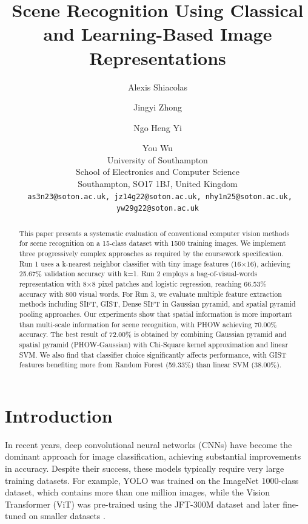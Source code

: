 \documentclass[10pt,twocolumn,letterpaper]{article}
\begin{document}
\title{Scene Recognition Using Classical and Learning-Based Image Representations}

\author{
Alexis Shiacolas \and
Jingyi Zhong \and
Ngo Heng Yi \and
You Wu \\
University of Southampton \\
School of Electronics and Computer Science \\
Southampton, SO17 1BJ, United Kingdom \\
{\tt\small
as3n23@soton.ac.uk,
jz14g22@soton.ac.uk,
nhy1n25@soton.ac.uk,
yw29g22@soton.ac.uk}
}

\maketitle




\begin{abstract}
This paper presents a systematic evaluation of conventional computer vision methods for scene recognition on a 15-class dataset with 1500 training images. We implement three progressively complex approaches as required by the coursework specification. Run 1 uses a k-nearest neighbor classifier with tiny image features (16$\times$16), achieving 25.67\% validation accuracy with k=1. Run 2 employs a bag-of-visual-words representation with 8$\times$8 pixel patches and logistic regression, reaching 66.53\% accuracy with 800 visual words. For Run 3, we evaluate multiple feature extraction methods including SIFT, GIST, Dense SIFT in Gaussian pyramid, and spatial pyramid pooling approaches. Our experiments show that spatial information is more important than multi-scale information for scene recognition, with PHOW achieving 70.00\% accuracy. The best result of 72.00\% is obtained by combining Gaussian pyramid and spatial pyramid (PHOW-Gaussian) with Chi-Square kernel approximation and linear SVM. We also find that classifier choice significantly affects performance, with GIST features benefiting more from Random Forest (59.33\%) than linear SVM (38.00\%).
\end{abstract}


\section{Introduction}

In recent years, deep convolutional neural networks (CNNs) have become the dominant approach for image classification, achieving substantial improvements in accuracy. Despite their success, these models typically require very large training datasets. For example, YOLO was trained on the ImageNet 1000-class dataset, which contains more than one million images, while the Vision Transformer (ViT) was pre-trained using the JFT-300M dataset and later fine-tuned on smaller datasets \cite{redmon2016you, dosovitskiy2020image}.
\end{document}
